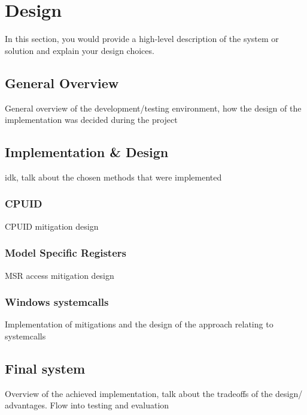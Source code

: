 \section{Design}\label{s:design}

In this section, you would provide a high-level description of the system or
solution and explain your design choices.

\subsection{General Overview}
General overview of the development/testing environment, how the design of the implementation was decided during the project

\subsection{Implementation \& Design}
idk, talk about the chosen methods that were implemented
\subsubsection{CPUID}
CPUID mitigation design
\subsubsection{Model Specific Registers}
MSR access mitigation design
\subsubsection{Windows systemcalls}
Implementation of mitigations and the design of the approach relating to systemcalls

\subsection{Final system}
Overview of the achieved implementation, talk about the tradeoffs of the design/ advantages. Flow into testing and evaluation



